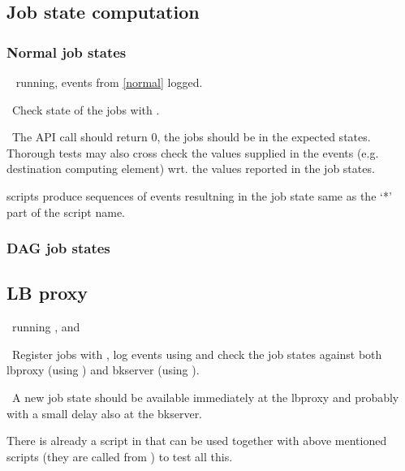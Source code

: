 \subsection{Job state computation}

\subsubsection{Normal job states}
\label{state}
\req\  running, events from \ref{normal} logged.

\how\ Check state of the jobs with .

\result\ The API call should return 0, the jobs should be in the expected
states. Thorough tests may also cross check the values supplied in the
events (e.g. destination computing element) wrt. the values reported in the job states.

\begin{hints}
 scripts produce sequences of events resultning
in the job state same as the `*' part of the script name.
\end{hints}

\subsubsection{DAG job states}
\TODO{}

\subsection{LB proxy}
\req\ running ,  and

\how\ Register jobs with , log events
using  and check the job states against
both lbproxy (using ) and bkserver
(using ).

\result\ A new job state should be available immediately at the
lbproxy and probably with a small delay also at the bkserver.

\begin{hints}
There is already a script  in
 that can be used together with
above mentioned scripts  (they are called from
) to test all this.
\end{hints}

